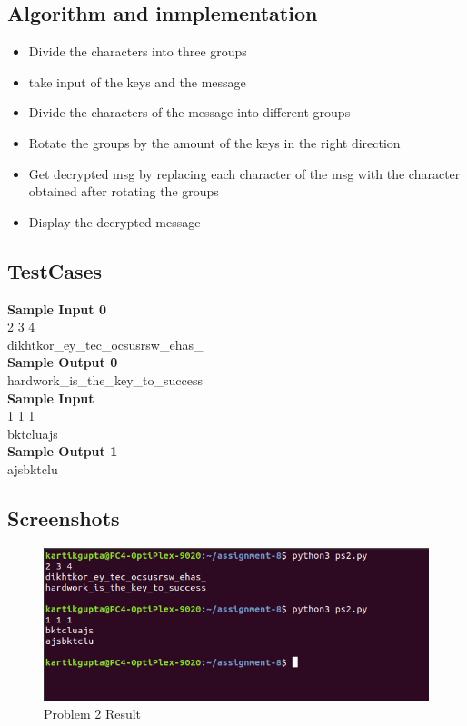 \documentclass[12pt]{article}
\begin{document}
\newpage

\subsection{Algorithm and inmplementation}

\begin{itemize}
\item Divide the characters into three groups
\item  take input of the keys and the message
\item Divide the characters of the message into different  groups
\item Rotate the groups by the amount of the keys in the right direction
\item Get decrypted msg by replacing each character of the msg with the character obtained after rotating the groups
\item Display the decrypted message

\end{itemize}

\subsection{TestCases}
\textbf{Sample Input 0}\\
2 3 4\\
dikhtkor\_ey\_tec\_ocsusrsw\_ehas\_\\
\textbf{Sample Output 0}\\
hardwork\_is\_the\_key\_to\_success\\
\textbf{Sample Input }\\
1 1 1\\
bktcluajs\\
\textbf{Sample Output 1}\\
ajsbktclu


\newpage

\subsection{Screenshots}
\begin{figure}[h]
\begin{center}
\includegraphics[scale=.70]{ps2_result.png}
\caption{Problem 2 Result}
\end{center}
\end{figure}
\newpage
\end{document}
